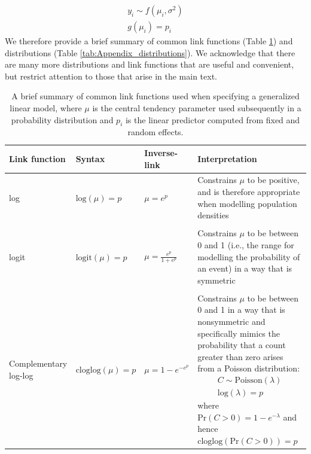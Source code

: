 \begin{equation}
\begin{gathered}
  y_i \sim f( \mu_i, \sigma^2 ) \\
  g(\mu_i) = p_i
\end{gathered}
\end{equation}
We therefore provide a brief summary of common link functions (Table \ref{tab:Appendix_link_functions}) and distributions (Table \ref{tab:Appendix_distributions}).  We acknowledge that there are many more distributions and link functions that are useful and convenient, but restrict attention to those that arise in the main text.  

\begin{table}
  \caption[List of common link functions]{A brief summary of common link functions used when specifying a generalized linear model, where \(\mu\) is the central tendency parameter used subsequently in a probability distribution and \(p_i\) is the linear predictor computed from fixed and random effects.}
\begin{center}
\begin{tabularx}{\textwidth}{ | X X X m{2in} | } 
  \hline
  Link function & Syntax & Inverse-link & Interpretation \\ 
  \hline

  log & \(\mathrm{log}(\mu) = p \) &  \( \mu = e^{p} \) & Constrains \(\mu\) to be positive, and is therefore appropriate when modelling population densities \\ & & & \\ 

  logit & \(\mathrm{logit}(\mu) = p \) &  \( \mu = \frac{e^{p}}{1+e^{p}} \) & Constrains \(\mu\) to be between 0 and 1 (i.e., the range for modelling the probability of an event) in a way that is symmetric \\ & & & \\ 

  Complementary log-log & \(\mathrm{cloglog}(\mu) = p \) &  \( \mu = 1-e^{-e^{p}} \) & Constrains \(\mu\) to be between 0 and 1 in a way that is nonsymmetric and specifically mimics the probability that a count greater than zero arises from a Poisson distribution:
  \begin{equation}
  \begin{gathered}
      C \sim \mathrm{Poisson}(\lambda) \\
      \mathrm{log}(\lambda) = p
  \end{gathered}
  \end{equation}
  where \( \mathrm{Pr}(C > 0) = 1-e^{-\lambda} \) and hence \( \mathrm{cloglog}(\mathrm{Pr}(C > 0)) = p \)  \\ 
 
  \hline
\end{tabularx}
  \label{tab:Appendix_link_functions}
\end{center}
\end{table}

